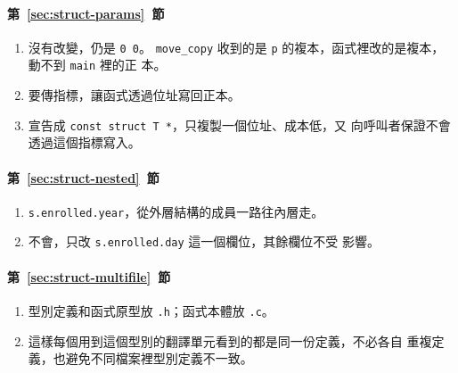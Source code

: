 \paragraph{第~\ref{sec:struct-params}~節}
\begin{enumerate}
\item 沒有改變，仍是 \texttt{0 0}。 \texttt{move\_copy} 收到的是
\texttt{p} 的複本，函式裡改的是複本，動不到 \texttt{main} 裡的正
本。
\item 要傳指標，讓函式透過位址寫回正本。
\item 宣告成 \texttt{const struct T *}，只複製一個位址、成本低，又
向呼叫者保證不會透過這個指標寫入。
\end{enumerate}

\paragraph{第~\ref{sec:struct-nested}~節}
\begin{enumerate}
\item \texttt{s.enrolled.year}，從外層結構的成員一路往內層走。
\item 不會，只改 \texttt{s.enrolled.day} 這一個欄位，其餘欄位不受
影響。
\end{enumerate}

\paragraph{第~\ref{sec:struct-multifile}~節}
\begin{enumerate}
\item 型別定義和函式原型放 \texttt{.h}；函式本體放 \texttt{.c}。
\item 這樣每個用到這個型別的翻譯單元看到的都是同一份定義，不必各自
重複定義，也避免不同檔案裡型別定義不一致。
\end{enumerate}
